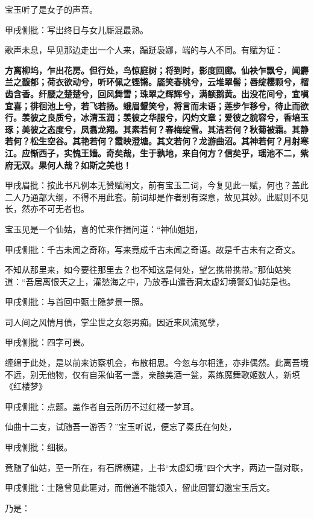 \begin{parag}
    宝玉听了是女子的声音。\begin{note}甲戌侧批：写出终日与女儿厮混最熟。\end{note}歌声未息，早见那边走出一个人来，蹁跹袅娜，端的与人不同。有赋为证：
\end{parag}
\begin{qute2sp}
    \textbf{
        方离柳坞，乍出花房。但行处，鸟惊庭树；将到时，影度回廊。仙袂乍飘兮，闻麝兰之馥郁；荷衣欲动兮，听环佩之铿锵。靥笑春桃兮，云堆翠髻；唇绽樱颗兮，榴齿含香。纤腰之楚楚兮，回风舞雪；珠翠之辉辉兮，满额鹅黄。出没花间兮，宜嗔宜喜；徘徊池上兮，若飞若扬。蛾眉颦笑兮，将言而未语；莲步乍移兮，待止而欲行。羡彼之良质兮，冰清玉润；羡彼之华服兮，闪灼文章；爱彼之貌容兮，香培玉琢；美彼之态度兮，凤翥龙翔。其素若何？春梅绽雪。其洁若何？秋菊被霜。其静若何？松生空谷。其艳若何？霞映澄塘。其文若何？龙游曲沼。其神若何？月射寒江。应惭西子，实愧王嫱。奇矣哉，生于孰地，来自何方？信矣乎，瑶池不二，紫府无双。果何人哉？如斯之美也！}
    \begin{note}甲戌眉批：按此书凡例本无赞赋闲文，前有宝玉二词，今复见此一赋，何也？盖此二人乃通部大纲，不得不用此套。前词却是作者别有深意，故见其妙。此赋则不见长，然亦不可无者也。\end{note}

\end{qute2sp}
\begin{parag}
    宝玉见是一个仙姑，喜的忙来作揖问道：“神仙姐姐，\begin{note}甲戌侧批：千古未闻之奇称，写来竟成千古未闻之奇语。故是千古未有之奇文。\end{note}不知从那里来，如今要往那里去？也不知这是何处，望乞携带携带。”那仙姑笑道：“吾居离恨天之上，灌愁海之中，乃放春山遣香洞太虚幻境警幻仙姑是也。\begin{note}甲戌侧批：与首回中甄士隐梦景一照。\end{note}司人间之风情月债，掌尘世之女怨男痴。因近来风流冤孽，\begin{note}甲戌侧批：四字可畏。\end{note}缠绵于此处，是以前来访察机会，布散相思。今忽与尔相逢，亦非偶然。此离吾境不远，别无他物，仅有自采仙茗一盏，亲酿美酒一瓮，素练魔舞歌姬数人，新填《红楼梦》\begin{note}甲戌侧批：点题。盖作者自云所历不过红楼一梦耳。\end{note}仙曲十二支，试随吾一游否？”宝玉听说，便忘了秦氏在何处，\begin{note}甲戌侧批：细极。\end{note}竟随了仙姑，至一所在，有石牌横建，上书“太虚幻境”四个大字，两边一副对联，\begin{note}甲戌侧批：士隐曾见此匾对，而僧道不能领入，留此回警幻邀宝玉后文。\end{note}乃是：
\end{parag}


